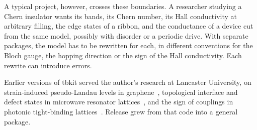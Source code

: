 \documentclass[submission, Phys]{SciPost}
\begin{document}
A typical project, however, crosses these boundaries. A researcher studying
a Chern insulator wants its bands, its Chern number, its Hall conductivity
at arbitrary filling, the edge states of a ribbon, and the conductance of
a device cut from the same model, possibly with disorder or a periodic
drive. With separate packages, the model has to be rewritten for each, in
different conventions for the Bloch gauge, the hopping direction or the
sign of the Hall conductivity. Each rewrite can introduce errors.

Earlier versions of tbkit served the author's research at Lancaster
University, on strain-induced pseudo-Landau levels in
graphene~\cite{poli2014,bellec2020}, topological interface and defect
states in microwave resonator lattices~\cite{poli2015,poli2017}, and the
sign of couplings in photonic tight-binding lattices~\cite{keil2016}.
Release \tbkitversion{} grew from that code into a general package.
\end{document}
